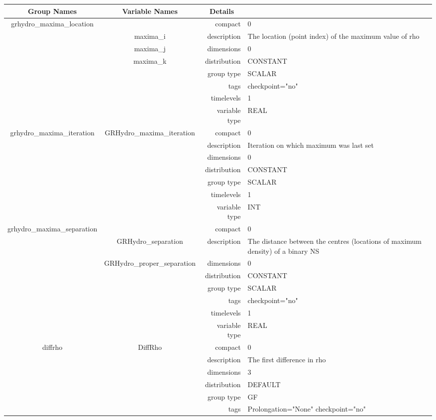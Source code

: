 \begin{tabular*}{150mm}{|c|c@{\extracolsep{\fill}}|rl|} \hline 
~ {\bf Group Names} ~ & ~ {\bf Variable Names} ~  &{\bf Details} ~ & ~ \\ 
\hline 
grhydro\_maxima\_location &  & compact & 0 \\ 
 & maxima\_i & description & The location (point index) of the maximum value of rho \\ 
 & maxima\_j & dimensions & 0 \\ 
 & maxima\_k & distribution & CONSTANT \\ 
 &  & group type & SCALAR \\ 
 &  & tags & checkpoint="no" \\ 
 &  & timelevels & 1 \\ 
 &  & variable type & REAL \\ 
\hline 
grhydro\_maxima\_iteration & GRHydro\_maxima\_iteration & compact & 0 \\ 
 &  & description & Iteration on which maximum was last set \\ 
 &  & dimensions & 0 \\ 
 &  & distribution & CONSTANT \\ 
 &  & group type & SCALAR \\ 
 &  & timelevels & 1 \\ 
 &  & variable type & INT \\ 
\hline 
grhydro\_maxima\_separation &  & compact & 0 \\ 
 & GRHydro\_separation & description & The distance between the centres (locations of maximum density) of a binary NS \\ 
 & GRHydro\_proper\_separation & dimensions & 0 \\ 
 &  & distribution & CONSTANT \\ 
 &  & group type & SCALAR \\ 
 &  & tags & checkpoint="no" \\ 
 &  & timelevels & 1 \\ 
 &  & variable type & REAL \\ 
\hline 
diffrho & DiffRho & compact & 0 \\ 
 &  & description & The first difference in rho \\ 
 &  & dimensions & 3 \\ 
 &  & distribution & DEFAULT \\ 
 &  & group type & GF \\ 
 &  & tags & Prolongation="None" checkpoint="no" \\ 

\end{tabular*}
